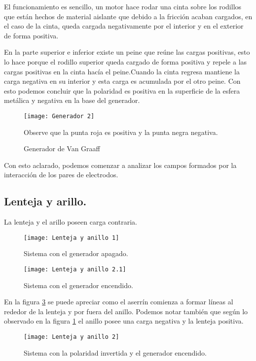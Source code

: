 \documentclass[14pt]{article}
\begin{document}
El funcionamiento es sencillo, un motor hace rodar una cinta sobre los rodillos que están hechos de material aislante que debido a la fricción acaban cargados, en el caso de la cinta, queda cargada negativamente por el interior y en el exterior de forma positiva.

En la parte superior e inferior existe un peine que reúne las cargas positivas, esto lo hace porque el rodillo superior queda cargado de forma positiva y repele a las cargas positivas en la cinta hacía el peine.Cuando la cinta regresa mantiene la carga negativa en su interior y esta carga es acumulada por el otro peine. Con esto podemos concluir que la polaridad es positiva en la superficie de la esfera metálica y negativa en la base del generador.

\begin{figure}[h!]
	\centering
	\texttt{[image: Generador 2]}
	\caption{Generador de Van Graaff}
	\label{fig:Generador}
	Observe que la punta roja es positiva y la punta negra negativa.
\end{figure}

Con esto aclarado, podemos comenzar a analizar los campos formados por la interacción de los pares de electrodos.


\subsection{Lenteja y arillo.}



La lenteja y el arillo poseen carga contraria.

\begin{figure}[h!]
	\centering
	\texttt{[image: Lenteja y anillo 1]}
	\caption{Sistema con el generador apagado.}
	\label{fig:AyLO}
\end{figure}


\begin{figure}[h!]
	\centering
	\texttt{[image: Lenteja y anillo 2.1]}
	\caption{Sistema con el generador encendido.}
	\label{fig:AyLE1}
\end{figure}

En la figura \ref{fig:AyLE1} se puede apreciar como el aserrín comienza a formar líneas al rededor de la lenteja y por fuera del anillo. Podemos notar también que según lo observado en la figura \ref{fig:Generador} el anillo posee una carga negativa y la lenteja positiva.


\begin{figure}[h!]
	\centering
	\texttt{[image: Lenteja y anillo 2]}
	\caption{Sistema con la polaridad invertida y el generador encendido.}
	\label{fig:AyLE2}
\end{figure}
\end{document}

